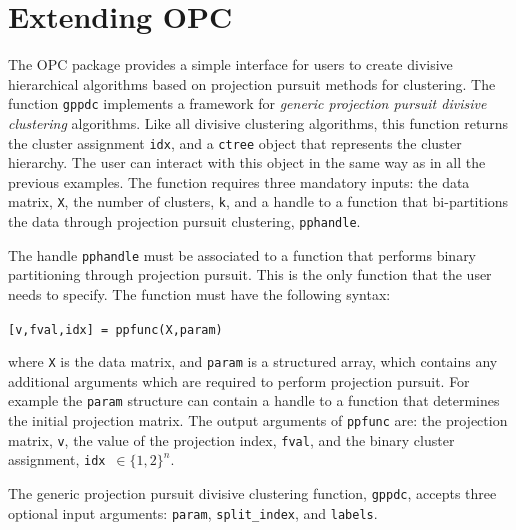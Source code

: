 \documentclass{book}
\begin{document}

\chapter{Extending OPC}\label{sec:extend}


The OPC package provides a simple interface for users to create divisive
hierarchical algorithms based on projection pursuit methods for clustering. 
%
The function {\tt gppdc} implements a framework for {\em generic projection
pursuit divisive clustering} algorithms.
%
Like all divisive clustering algorithms, this function returns the cluster
assignment {\tt idx}, and a {\tt ctree} object that represents the cluster
hierarchy. The user can interact with this object in the same way as in all the
previous examples.
%
The function requires three mandatory inputs: the data matrix, {\tt X}, the
number of clusters, {\tt k}, and a handle to a function that bi-partitions the
data through projection pursuit clustering, {\tt pphandle}.
%

The handle {\tt pphandle} must be associated to a function that performs
binary partitioning through projection pursuit. This is the only function that
the user needs to specify. The function must have the following syntax:

\begin{center}
{\tt [v,fval,idx] = ppfunc(X,param)}
\end{center}
%
where {\tt X} is the data matrix, and {\tt param} is a structured array, which
%
contains any additional arguments which are required to perform projection pursuit.
%
For example the {\tt param} structure can contain a handle to a function that
determines the initial projection matrix.
%
The output arguments of {\tt ppfunc}
are: the projection matrix, {\tt v}, the value of the projection index,
{\tt fval}, and the binary cluster assignment, {\tt idx}~$\in \{1,2\}^n$.


The generic projection pursuit divisive clustering function, {\tt gppdc},
accepts three optional input arguments: {\tt param}, {\tt split\_index}, and
{\tt labels}.
\end{document}

